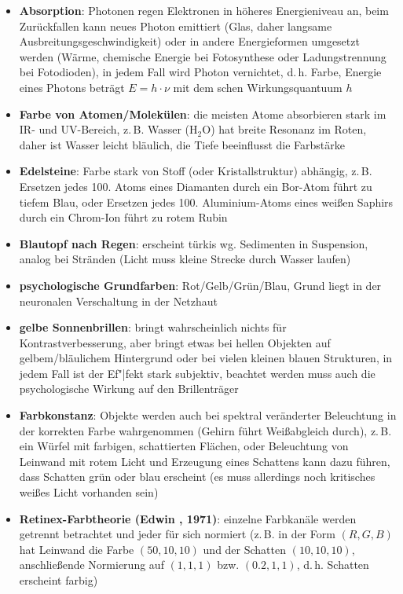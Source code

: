 \begin{itemize}
    \item
    \textbf{Absorption}:
    Photonen regen Elektronen in höheres Energieniveau an, beim Zurückfallen
    kann neues Photon emittiert (Glas, daher
    langsame Ausbreitungsgeschwindigkeit) oder in andere Energieformen
    umgesetzt werden (Wärme, chemische Energie bei Fotosynthese oder
    Ladungstrennung bei Fotodioden), in jedem Fall wird Photon vernichtet,
    d.\,h. Farbe, Energie eines Photons beträgt $E = h \cdot \nu$ mit
    dem schen Wirkungsquantuum $h$

    \item
    \textbf{Farbe von Atomen/Molekülen}:
    die meisten Atome absorbieren stark im IR- und UV-Bereich, z.\,B.
    Wasser ($\text{H}_2 \text{O}$) hat breite Resonanz im Roten, daher ist
    Wasser leicht bläulich, die Tiefe beeinflusst die Farbstärke

    \item
    \textbf{Edelsteine}:
    Farbe stark von Stoff (oder Kristallstruktur) abhängig, z.\,B.
    Ersetzen jedes 100. Atoms eines Diamanten durch ein Bor-Atom führt zu
    tiefem Blau, oder Ersetzen jedes 100. Aluminium-Atoms eines weißen Saphirs
    durch ein Chrom-Ion führt zu rotem Rubin

    \item
    \textbf{Blautopf nach Regen}:
    erscheint türkis wg. Sedimenten in Suspension, analog bei Stränden
    (Licht muss kleine Strecke durch Wasser laufen)
\end{itemize}
\linie
\begin{itemize}
    \item
    \textbf{psychologische Grundfarben}:
    Rot/Gelb/Grün/Blau,
    Grund liegt in der neuronalen Verschaltung in der Netzhaut

    \item
    \textbf{gelbe Sonnenbrillen}:
    bringt wahrscheinlich nichts für Kontrastverbesserung, aber
    bringt etwas bei hellen Objekten auf gelbem/bläulichem Hintergrund
    oder bei vielen kleinen blauen Strukturen,
    in jedem Fall ist der Ef"|fekt stark subjektiv,
    beachtet werden muss auch die psychologische Wirkung auf den Brillenträger
\end{itemize}
\linie
\pagebreak
\begin{itemize}
    \item
    \textbf{Farbkonstanz}:
    Objekte werden auch bei spektral veränderter Beleuchtung in der korrekten
    Farbe wahrgenommen (Gehirn führt Weißabgleich durch), z.\,B.
    ein Würfel mit farbigen, schattierten Flächen,
    oder Beleuchtung von Leinwand mit rotem Licht und Erzeugung eines
    Schattens kann dazu führen, dass Schatten grün oder blau erscheint
    (es muss allerdings noch kritisches weißes Licht vorhanden sein)

    \item
    \textbf{Retinex-Farbtheorie (Edwin , 1971)}:
    einzelne Farbkanäle werden getrennt betrachtet und jeder für sich normiert
    (z.\,B. in der Form $(R, G, B)$ hat Leinwand die Farbe $(50, 10, 10)$ und
    der Schatten $(10, 10, 10)$, anschließende Normierung auf
    $(1, 1, 1)$ bzw. $(0.2, 1, 1)$, d.\,h. Schatten erscheint farbig)
\end{itemize}

